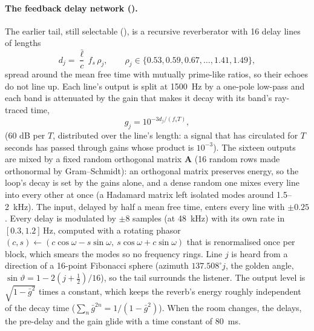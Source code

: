 \paragraph{The feedback delay network ().} The earlier tail, still selectable (), is a recursive
reverberator \citep{jot1991fdn} with 16 delay lines of lengths
\begin{equation}
  d_j = \frac{\bar\ell}{c}\,f_s\,\rho_j,\qquad \rho_j\in\{0.53, 0.59, 0.67, \dots, 1.41, 1.49\},
\end{equation}
spread around the mean free time with mutually prime-like ratios, so their echoes do not line up. Each line's output
is split at \SI{1500}{Hz} by a one-pole low-pass and each band is attenuated by the gain that makes it decay with its
band's ray-traced time,
\begin{equation}
  g_{j} = 10^{-3 d_j / (f_s T)},
\end{equation}
(60 dB per $T$, distributed over the line's length: a signal that has circulated for $T$ seconds has passed through
gains whose product is $10^{-3}$). The sixteen outputs are mixed by a fixed random orthogonal matrix $\mathbf A$
(16 random rows made orthonormal by Gram--Schmidt): an orthogonal matrix preserves energy, so the loop's decay is set
by the gains alone, and a dense random one mixes every line into every other at once (a Hadamard matrix left isolated
modes around 1.5--\SI{2}{kHz}). The input, delayed by half a mean free time, enters every line with $\pm0.25$. Every
delay is modulated by $\pm8$ samples (at \SI{48}{kHz}) with its own rate in $[0.3,1.2]$\,Hz, computed with a rotating
phasor $(c,s)\leftarrow(c\cos\omega - s\sin\omega,\ s\cos\omega + c\sin\omega)$ that is renormalised once per block,
which smears the modes so no frequency rings. Line $j$ is heard from a direction of a 16-point Fibonacci sphere
(azimuth $137.508^\circ j$, the golden angle, $\sin\vartheta = 1 - 2(j+\frac12)/16$), so the tail surrounds the
listener. The output level is $\sqrt{1-\bar g^2}$ times a constant, which keeps the reverb's energy roughly independent
of the decay time ($\sum_n \bar g^{2n} = 1/(1-\bar g^2)$). When the room changes, the delays, the pre-delay and the gain
glide with a time constant of \SI{80}{ms}.
